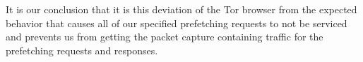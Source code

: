It is our conclusion that it is this deviation of the Tor browser from the expected behavior that causes all of our specified prefetching requests to not be serviced and prevents us from getting the packet capture containing traffic for the prefetching requests and responses.  



